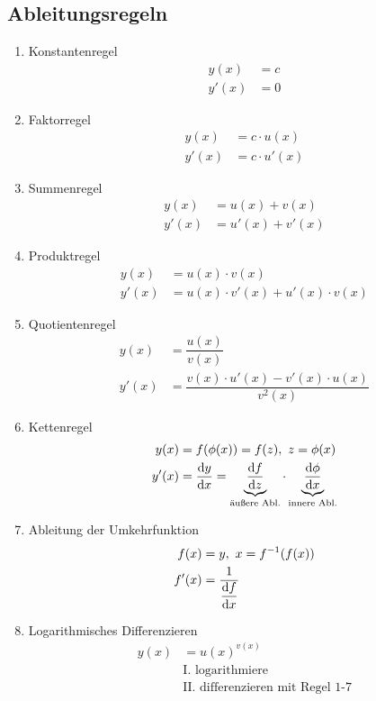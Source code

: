 \subsection{Ableitungsregeln}

\begin{enumerate}
    \item Konstantenregel
        \begin{align*}
			y(x) &= c \\
			y'(x) &= 0
        \end{align*}
    \item Faktorregel
        \begin{align*}
			y(x) &= c \cdot u(x) \\
			y'(x) &= c \cdot u'(x)
        \end{align*}
    \item Summenregel
    	\begin{align*}
			y(x) &= u(x) + v(x) \\
			y'(x) &= u'(x) + v'(x)
		\end{align*}
    \item Produktregel
		\begin{align*}
            y(x) &= u(x) \cdot v(x) \\
            y'(x) &= u(x) \cdot v'(x) + u'(x) \cdot v(x)
        \end{align*}
    \item Quotientenregel
        \begin{align*}
            y(x) &= \dfrac{u(x)}{v(x)} \\
            y'(x) &= \dfrac{v(x) \cdot u'(x) - v'(x) \cdot u(x)}{v^2(x)}
        \end{align*}
    \item Kettenregel
        \begin{align*}
            y(x) &= f(\phi(x)) = f(z),\ z = \phi(x) \\
            y'(x) &= \dfrac{\mathop{}\!\mathrm{d} y}{\mathop{}\!\mathrm{d} x} = \underbrace{\dfrac{\mathop{}\!\mathrm{d} f}{\mathop{}\!\mathrm{d} z}}_{\text{äußere Abl.}} \cdot \underbrace{\dfrac{\mathop{}\!\mathrm{d} \phi}{\mathop{}\!\mathrm{d} x}}_{\text{innere Abl.}}
        \end{align*}
    \item Ableitung der Umkehrfunktion
        \begin{align*}
            f(x) &= y,\ x = f^{-1}(f(x)) \\
            f'(x) &= \dfrac{1}{\dfrac{\mathop{}\!\mathrm{d} f}{\mathop{}\!\mathrm{d} x}}
        \end{align*}
    \item Logarithmisches Differenzieren
        \begin{align*}
            y(x) &= u(x)^{v(x)} \\
            &\text{I. logarithmiere} \\
            &\text{II. differenzieren mit Regel 1-7}
        \end{align*}
\end{enumerate}

